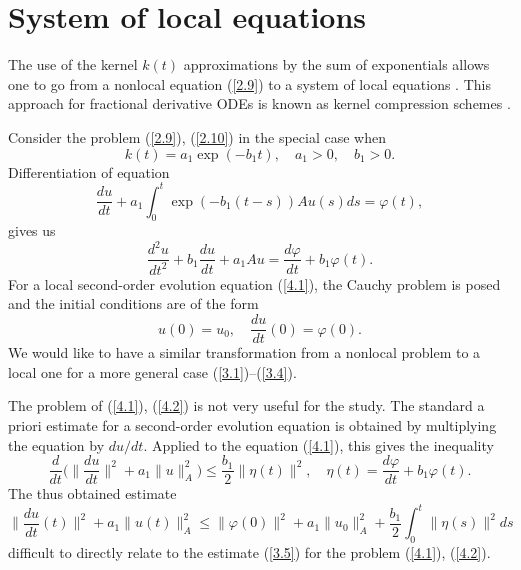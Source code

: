 \documentclass[3p]{elsarticle}
\numberwithin{equation}{section}
\begin{document}
\section{System of local equations}\label{sec:4} 

The use of the kernel $k(t)$ approximations by the sum of exponentials allows one to go from a nonlocal equation (\ref{2.9}) to a system of local equations \cite{linz1985analytical}.
This approach for fractional derivative ODEs is known as kernel compression schemes \cite{diethelm2020good,baffet2017kernel,baffet2017high}.

Consider the problem  (\ref{2.9}), (\ref{2.10}) in the special case when
\[
 k(t) = a_1\exp(-b_1 t),
 \quad a_1 > 0, \quad b_1 > 0 .   
\] 
Differentiation of equation
\[
 \frac{d u}{d t} + a_1\int_{0}^{t} \exp(-b_1 (t-s))  A u(s) d s = \varphi (t),
\] 
gives us
\begin{equation}\label{4.1}
  \frac{d^2 u}{d t^2} + b_1 \frac{d u}{d t} + a_1 A u = \frac{d \varphi}{d t} + b_1 \varphi (t) .  
\end{equation} 
For a local second-order evolution equation (\ref{4.1}), the Cauchy problem is posed and the initial conditions are of the form
\begin{equation}\label{4.2}
 u(0) = u_0,
 \quad  \frac{d u}{d t}(0) = \varphi (0) .
\end{equation} 
We would like to have a similar transformation from a nonlocal problem to a local one for a more general case (\ref{3.1})--(\ref{3.4}).  

The problem of (\ref{4.1}), (\ref{4.2}) is not very useful for the study.
The standard a priori estimate for a second-order evolution equation is obtained by multiplying the equation by $d u / dt$.
Applied to the equation (\ref{4.1}), this gives the inequality
\[
 \frac{d}{d t} \Big( \Big \|\frac{d u}{d t} \Big\|^2 + a_1 \|u\|_A^2 \Big) \leq \frac{b_1}{2}  \|\eta (t)\|^2,
 \quad \eta (t) = \frac{d \varphi}{d t} + b_1 \varphi (t) .  
\] 
The thus obtained estimate
\[
 \Big \|\frac{d u}{d t}(t) \Big\|^2 + a_1 \|u(t)\|_A^2 \leq \|\varphi (0)\|^2 + a_1 \|u_0\|_A^2 + \frac{b_1}{2} \int_{0}^{t}  \|\eta (s)\|^2 d s
\] 
difficult to directly relate to the estimate (\ref{3.5}) for the problem (\ref{4.1}), (\ref{4.2}).
\end{document}
